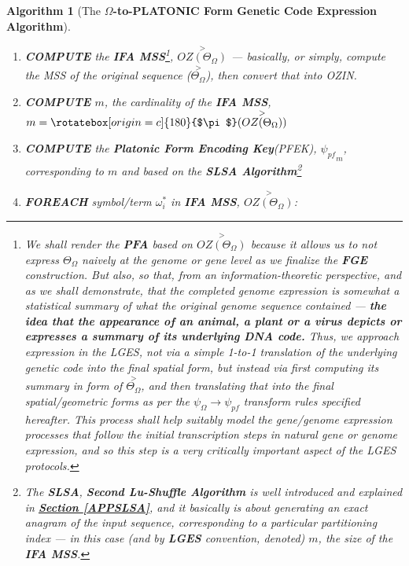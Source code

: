\documentclass[a4paper, 18pt]{book} %
\newtheorem{alg}{Algorithm}
\newcommand{\invpi}{\rotatebox[origin=c]{180}{$\pi$}}
\begin{document}
\begin{alg}[The \textbf{$\Omega$-to-PLATONIC Form Genetic Code Expression Algorithm}]
\begin{enumerate}
{\begin{enumerate}
{\vspace{1em}
\begin{equation}
\label{EQSTARTFGESUF}
\boxed{OZ(\Theta_\Omega)} = \langle \rangle
\end{equation}
\vspace{1em}

}
\item {
	\textbf{COMPUTE} the \textbf{IFA MSS}\footnote{We shall render the \textbf{PFA} based on $\overset{>}{OZ(\Theta_\Omega)}$ because it allows us to not express $\Theta_\Omega$ naively at the genome or gene level as we finalize the \textbf{FGE} construction. But also, so that, from an information-theoretic perspective, and as we shall demonstrate, that the completed genome expression is somewhat a statistical summary of what the original genome sequence contained --- \textbf{the idea that the appearance of an animal, a plant or a virus depicts or expresses a summary of its underlying DNA code.} Thus, we approach expression in the LGES, not via a simple 1-to-1 translation of the underlying genetic code into the final spatial form, but instead via first computing its summary in form of $\overset{>}{\Theta_\Omega}$, and then  translating that into the final spatial/geometric forms as per the $\psi_{\Omega} \rightarrow \psi_{pf}$ transform rules specified hereafter. This process shall help suitably model the gene/genome expression processes that follow the initial transcription steps in natural gene or genome expression, and so this step is a very critically important aspect of the LGES protocols.}, $\overset{>}{OZ(\Theta_\Omega)}$ --- basically, or simply, compute the MSS of the original sequence ($\overset{>}{\Theta_\Omega}$), then convert that into OZIN.
}
\item {
	\textbf{COMPUTE} $m$, the cardinality of the \textbf{IFA MSS}, $m = \invpi(\overset{>}{OZ(\Theta_\Omega)})$
}
\item {
	\textbf{COMPUTE} the \textbf{Platonic Form Encoding Key}(PFEK), $\boxed{\psi_{pf}}_m$, corresponding to $m$ and based on the \textbf{SLSA Algorithm}\footnote{The \textbf{SLSA}, \textbf{Second Lu-Shuffle Algorithm} is well introduced and explained in \textbf{\hyperref[APPSLSA]{Section \ref{APPSLSA}}}, and it basically is about generating an exact anagram of the input sequence, corresponding to a particular partitioning index --- in this case (and by \textbf{LGES} convention, denoted) $m$, the size of the \textbf{IFA MSS}.}
}
\item{\textbf{FOREACH} symbol/term $\omega_i^*$ in \textbf{IFA MSS}, $\overset{>}{OZ(\Theta_\Omega)}$: 
}
\end{enumerate}}
\end{enumerate}
\end{alg}
\end{document}
